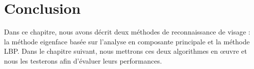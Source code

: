\section{Conclusion}
Dans ce chapitre, nous avons décrit deux méthodes de reconnaissance de visage : la méthode eigenface basée sur l'analyse en composante principale et la méthode LBP. Dans le chapitre suivant, nous mettrons ces deux algorithmes en œuvre et nous les testerons afin d'évaluer leurs performances.